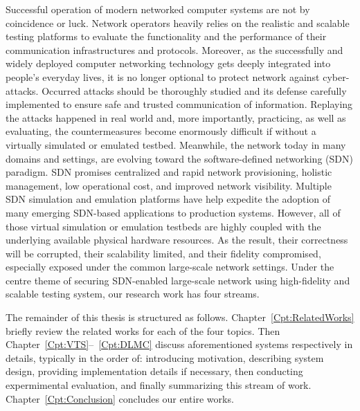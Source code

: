Successful operation of modern networked computer systems are not by coincidence or luck.
Network operators heavily relies on the realistic and scalable testing platforms to
evaluate the functionality and the performance of their communication infrastructures and protocols.
Moreover, as the successfully and widely deployed computer networking technology gets deeply integrated into people's everyday lives,
it is no longer optional to protect network against cyber-attacks.
Occurred attacks should be thoroughly studied and its defense carefully implemented to ensure safe and trusted communication of information.
Replaying the attacks happened in real world and, more importantly, practicing, as well as evaluating, the countermeasures become 
enormously difficult if without a virtually simulated or emulated testbed.
Meanwhile, the network today in many domains and settings, are evolving toward the software-defined networking (SDN) paradigm.
SDN promises centralized and rapid network provisioning, holistic management, low operational cost, and improved network visibility.
Multiple SDN simulation and emulation platforms have help expedite the adoption of many emerging SDN-based applications to production systems.
However, all of those virtual simulation or emulation testbeds are highly coupled with the underlying available physical hardware resources.
As the result, their correctness will be corrupted, their scalability limited, and their fidelity compromised,
especially exposed under the common large-scale network settings.
Under the centre theme of securing SDN-enabled large-scale network using high-fidelity and scalable testing system, our research work has four streams.






The remainder of this thesis is structured as follows.
Chapter~\ref{Cpt:RelatedWorks} briefly review the related works for each of the four topics.
Then Chapter~\ref{Cpt:VTS}--~\ref{Cpt:DLMC} discuss aforementioned systems respectively in details,
typically in the order of: introducing motivation, describing system design, providing implementation details if necessary,
then conducting expermimental evaluation, and finally summarizing this stream of work.
Chapter~\ref{Cpt:Conclusion} concludes our entire works.
